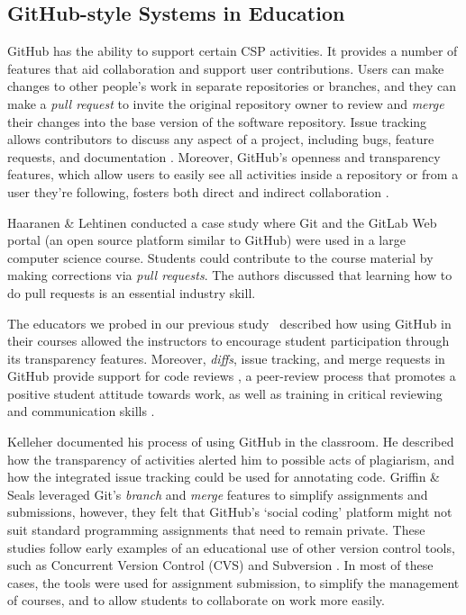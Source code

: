 \subsection{GitHub-style Systems in Education}
GitHub has the ability to support certain CSP activities. It provides a number of features that aid collaboration and support user contributions. Users can make changes to other people's work in separate repositories or branches, and they can make a \emph{pull request} to invite the original repository owner to review and \emph{merge} their changes into the base version of the software repository. Issue tracking allows contributors to discuss any aspect of a project, including bugs, feature requests, and documentation \cite{bissyande2013got}. Moreover, GitHub's openness and transparency features, which allow users to easily see all activities inside a repository or from a user they're following, fosters both direct and indirect collaboration \cite{dabbish2012social}.

Haaranen \& Lehtinen \cite{haaranen2015teaching} conducted a case study where Git and the GitLab Web portal (an open source platform similar to GitHub) were used in a large computer science course. Students could contribute to the course material by making corrections via \emph{pull requests}. The authors discussed that learning how to do pull requests is an essential industry skill.

The educators we probed in our previous study~\cite{zagalsky2015emergence} described how using GitHub in their courses allowed the instructors to encourage student participation through its transparency features. Moreover, \emph{diffs}, issue tracking, and merge requests in GitHub provide support for code reviews \cite{kalliamvakou2014promises}, a peer-review process that promotes a positive student attitude towards work, as well as training in critical reviewing and communication skills \cite{hundhausen2013talking}.

Kelleher \cite{kelleher2014employing} documented his process of using GitHub in the classroom. He described how the transparency of activities alerted him to possible acts of plagiarism, and how the integrated issue tracking could be used for annotating code. Griffin \& Seals \cite{griffin2013github} leveraged Git's \emph{branch} and \emph{merge} features to simplify assignments and submissions, however, they felt that GitHub's `social coding' platform might not suit standard programming assignments that need to remain private. These studies follow early examples of an educational use of other version control tools, such as Concurrent Version Control (CVS) \cite{reid2005learning} and Subversion \cite{clifton2007subverting}. In most of these cases, the tools were used for assignment submission, to simplify the management of courses, and to allow students to collaborate on work more easily. %

